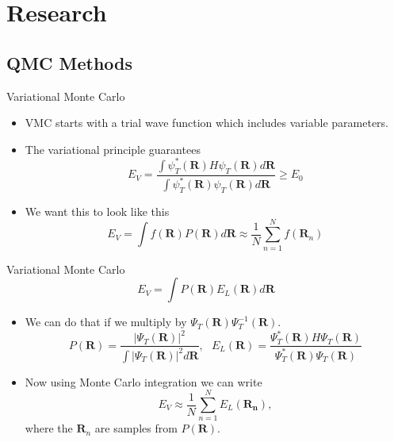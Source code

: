 \documentclass{beamer}
\newcommand{\R}{\mathbf{R}}
\begin{document}
\section{Research}
\subsection{QMC Methods}
\begin{frame}{Variational Monte Carlo}
\begin{itemize}
   \item VMC starts with a trial wave function which includes variable parameters.
   \item The variational principle guarantees
   \begin{equation*}
      E_V = \frac{\int\psi_T^*(\R)H\psi_T(\R)d\R}{\int\psi_T^*(\R)\psi_T(\R)d\R} \ge E_0
   \end{equation*}
   \item We want this to look like this
   \begin{equation*}
      E_V = \int f(\R)P(\R) d\R \approx \frac{1}{N}\sum\limits_{n=1}^N f(\R_n)
   \end{equation*}
\end{itemize}
\end{frame}

\begin{frame}{Variational Monte Carlo}
   \begin{equation*}
      E_V = \int P(\R)E_L(\R) d\R
   \end{equation*}
\begin{itemize}
   \item We can do that if we multiply by $\Psi_T(\R)\Psi_T^{-1}(\R)$.
   \begin{equation*}
      P(\R) = \frac{|\Psi_T(\R)|^2}{\int|\Psi_T(\R)|^2d\R}, ~~~
      E_L(\R) = \frac{\Psi_T^*(\R) H \Psi_T(\R)}{\Psi_T^*(\R) \Psi_T(\R)}
   \end{equation*}
   \item Now using Monte Carlo integration we can write
   \begin{equation*}
      E_V \approx \frac{1}{N} \sum\limits_{n=1}^N E_L(\mathbf{R_n}),
   \end{equation*}
   where the $\R_n$ are samples from $P(\R)$.
\end{itemize}
\end{frame}
\end{document}
